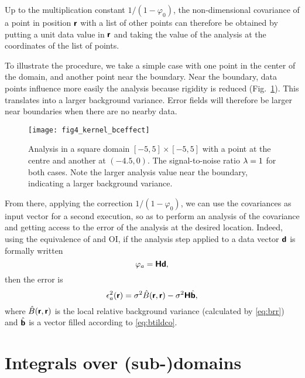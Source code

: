 Up to the multiplication constant $1/(1-\varphi_0)$, the non-dimensional covariance of a point in position $\mbox{\boldmath $ \protect\mathsf{r} $}$ with a list of other points can therefore be obtained by putting a unit data value in $\mbox{\boldmath $ \protect\mathsf{r} $}$ and taking the value of the analysis at the coordinates of the list of points. 


To illustrate the procedure, we take a simple case with one point in the center of the domain, and another point near the boundary.
Near the boundary, data points influence more easily the analysis because rigidity is reduced (Fig.~\ref{fig:fig4_kernel_bceffect}). This translates into a larger background variance. Error fields will therefore be larger near boundaries when there are no nearby data.
 
\begin{figure}[htpb]
\centering
\texttt{[image: fig4\_kernel\_bceffect]}
\caption{Analysis in a square domain $[-5,5]\times[-5,5]$ with a point at the centre and another at $(-4.5,0)$. The signal-to-noise ratio $\lambda=1$ for both cases. Note the larger analysis value near the boundary, indicating a larger background variance.
\label{fig:fig4_kernel_bceffect}}
\end{figure} 
 
 
From there, applying the correction $1/(1-\varphi_0)$, we can use the covariances as input vector for a second \diva execution, so as to perform an analysis of the covariance and getting access to the error of the analysis at the desired location. Indeed, using the equivalence of \diva and OI, if the analysis step applied to a data vector $\mbox{\boldmath $ \protect\mathsf{d} $}$ is formally written 
\begin{equation}
\varphi_a = \mbox{\boldmath $ \protect\mathsf{H} $} \mbox{\boldmath $ \protect\mathsf{d} $},
\end{equation}
then the error is 
\begin{equation}
\epsilon_a^2 (\mbox{\boldmath $ \protect\mathsf{r} $}) = \sigma^2 \hat{B}(\mbox{\boldmath $ \protect\mathsf{r} $},\mbox{\boldmath $ \protect\mathsf{r} $}) - \sigma^2 \mbox{\boldmath $ \protect\mathsf{H} $} \hat{\mbox{\boldmath $ \protect\mathsf{b} $}},
\end{equation}
where $\hat{B}(\mbox{\boldmath $ \protect\mathsf{r} $},\mbox{\boldmath $ \protect\mathsf{r} $})$ is the local relative background variance (calculated by \eqref{eq:brr}) and $\hat{\mbox{\boldmath $ \protect\mathsf{b} $}}$ is a vector filled according to \eqref{eq:btildco}.

\clearpage

\section{Integrals over (sub-)domains}

